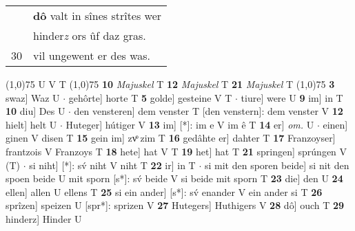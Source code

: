 \documentclass[8pt,a4paper,notitlepage]{article}
\begin{document}
\begin{table}[ht]
\begin{minipage}[t]{0.5\linewidth}
\begin{tabular}{rl}
 & \textbf{dô} valt in sînes strîtes wer\\ 
 & hinder\textit{z} ors ûf daz gras.\\ 
30 & vil ungewent er des was.\\ 
\end{tabular}
\scriptsize
\line(1,0){75} \newline
U V T \newline
\line(1,0){75} \newline
\textbf{10} \textit{Majuskel} T  \textbf{12} \textit{Majuskel} T  \textbf{21} \textit{Majuskel} T  \newline
\line(1,0){75} \newline
\textbf{3} swaz] Waz U  $\cdot$ gehôrte] horte T \textbf{5} golde] gesteine V T  $\cdot$ tiure] were U \textbf{9} im] in T \textbf{10} diu] Des U  $\cdot$ den vensteren] dem venster T [den venstern]: dem venster V \textbf{12} hielt] helt U  $\cdot$ Huteger] hútiger V \textbf{13} im] [*]: im e V im ê T \textbf{14} er] \textit{om.} U  $\cdot$ einen] ginen V disen T \textbf{15} gein im] zvͦ zim T \textbf{16} gedâhte er] dahter T \textbf{17} Franzoyser] frantzois V Franzoys T \textbf{18} hete] hat V T \textbf{19} het] hat T \textbf{21} springen] sprúngen V (T)  $\cdot$ si niht] [*]: sv́ niht V niht T \textbf{22} ir] in T  $\cdot$ si mit den sporen beide] si nit den spoen beide U mit sporn [s*]: sv́ beide V si beide mit sporn T \textbf{23} die] den U \textbf{24} ellen] allen U ellens T \textbf{25} si ein ander] [s*]: sv́ enander V ein ander si T \textbf{26} sprîzen] speizen U [spr*]: sprizen V \textbf{27} Hutegers] Huthigers V \textbf{28} dô] ouch T \textbf{29} hinderz] Hinder U \newline
\end{minipage}
\end{table}
\end{document}
